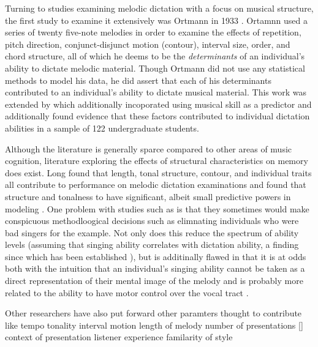 \documentclass[]{book}
\theoremstyle{definition}
\theoremstyle{definition}
\theoremstyle{definition}
\theoremstyle{remark}
\begin{document}
Turning to studies examining melodic dictation with a focus on musical
structure, the first study to examine it extensively was Ortmann in 1933
\citep{ortmannTonalDeterminantsMelodic1933}. Ortamnn used a series of
twenty five-note melodies in order to examine the effects of repetition,
pitch direction, conjunct-disjunct motion (contour), interval size,
order, and chord structure, all of which he deems to be the
\emph{determinants} of an individual's ability to dictate melodic
material. Though Ortmann did not use any statistical methods to model
his data, he did assert that each of his determinants contributed to an
individual's ability to dictate musical material. This work was extended
by \citep{taylorStrategiesMemoryShort1983} which additionally
incoporated using musical skill as a predictor and additionally found
evidence that these factors contributed to individual dictation
abilities in a sample of 122 undergraduate students.

Although the literature is generally sparce compared to other areas of
music cognition, literature exploring the effects of structural
characteristics on memory does exist. Long found that length, tonal
structure, contour, and individual traits all contribute to performance
on melodic dictation examinations and found that structure and tonalness
to have significant, albeit small predictive powers in modeling
\citep{longRelationshipsPitchMemory1977}. One problem with studies such
as \citep{longRelationshipsPitchMemory1977} is that they sometimes would
make conspicuous methodloogical decisions such as elimnating individuals
who were bad singers for the example. Not only does this reduce the
spectrum of ability levels (assuming that singing ability correlates
with dictation ability, a finding since which has been established
\citep{norrisRelationshipSightSinging2003}), but is additinally flawed
in that it is at odds both with the intuition that an individual's
singing ability cannot be taken as a direct representation of their
mental image of the melody and is probably more related to the ability
to have motor control over the vocal tract
\citep{pfordresherPoorPitchSingingAbsence2007}.

Other researchers have also put forward other paramters thought to
contribute like tempo
\citep{hofstetterComputerBaesedRecognitionPerceptual1981} tonality
\citep{dowlingScaleContourTwo1978}
\citep{longRelationshipsPitchMemory1977}
\citep{pembrookInterferenceTranscriptionProcess1986}
\citep{ouraMemoryMelodiesSubjects1988} interval motion
\citep{ortmannTonalDeterminantsMelodic1933, pembrookInterferenceTranscriptionProcess1986}
length of melody
\citep{longRelationshipsPitchMemory1977, pembrookInterferenceTranscriptionProcess1986}
number of presentations
\citep{hofstetterComputerBaesedRecognitionPerceptual1981}
{[}\citep{pembrookInterferenceTranscriptionProcess1986}{]} context of
presentation \citep{schellenbergEffectTonalRhythmicContext1985} listener
experience
\citep{longRelationshipsPitchMemory1977, ouraMemoryMelodiesSubjects1988}
\citep{schellenbergEffectTonalRhythmicContext1985, taylorStrategiesMemoryShort1983}
familarity of style \citep{schellenbergEffectTonalRhythmicContext1985}
\end{document}
